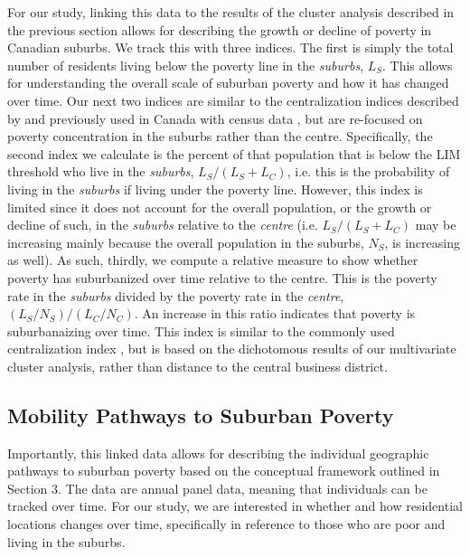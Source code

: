 For our study, linking this data to the results of the cluster analysis described in the previous section allows for describing the growth or decline of poverty in Canadian suburbs. We track this with three indices. The first is simply the total number of residents living below the poverty line in the \textit{suburbs}, $L_S$. This allows for understanding the overall scale of suburban poverty and how it has changed over time. Our next two indices are similar to the centralization indices described by  and previously used in Canada with census data \cite{ades_are_2012}, but are re-focused on poverty concentration in the suburbs rather than the centre. Specifically, the second index we calculate is the percent of that population that is below the LIM threshold who live in the \textit{suburbs}, $L_S / (L_S + L_C)$, i.e. this is the probability of living in the \textit{suburbs} if living under the poverty line. However, this index is limited since it does not account for the overall population, or the growth or decline of such, in the \textit{suburbs} relative to the \textit{centre} (i.e. $L_S / (L_S + L_C)$ may be increasing mainly because the overall population in the suburbs, $N_S$, is increasing as well). As such, thirdly, we compute a relative measure to show whether poverty has suburbanized over time relative to the centre. This is the poverty rate in the \textit{suburbs} divided by the poverty rate in the \textit{centre}, $(L_S / N_S) / (L_C / N_C)$. An increase in this ratio indicates that poverty is suburbanaizing over time. This index is similar to the commonly used centralization index \cite{duncan_methodological_1955,massey_dimensions_1988}, but is based on the dichotomous results of our multivariate cluster analysis, rather than distance to the central business district.








\subsection{Mobility Pathways to Suburban Poverty}

Importantly, this linked data allows for describing the individual geographic pathways to suburban poverty based on the conceptual framework outlined in Section 3. The data are annual panel data, meaning that individuals can be tracked over time. For our study, we are interested in whether and how residential locations changes over time, specifically in reference to those who are poor and living in the suburbs. 


